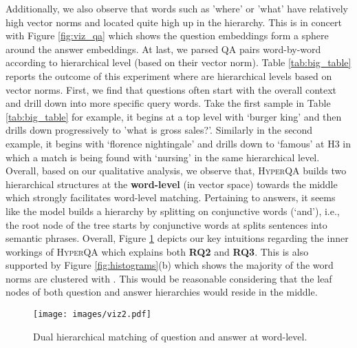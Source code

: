 \documentclass[sigconf]{acmart}
\begin{document}
 Additionally, we also observe that words such as 'where' or 'what' have relatively high vector norms and located quite high up in the hierarchy. This is in concert with Figure \ref{fig:viz_qa} which shows the question embeddings form a sphere around the answer embeddings. At last, we parsed QA pairs word-by-word according to hierarchical level (based on their vector norm). Table \ref{tab:big_table} reports the outcome of this experiment where  are hierarchical levels based on vector norms. First, we find that questions often start with the overall context and drill down into more specific query words. Take the first sample in Table \ref{tab:big_table} for example, it begins at a top level with `burger king' and then drills down progressively to 'what is gross sales?'. Similarly in the second example, it begins with `florence nightingale' and drills down to `famous' at H3 in which a match is being found with `nursing' in the same hierarchical level. Overall, based on our qualitative analysis, we observe that, \textsc{HyperQA} builds two hierarchical structures at the \textbf{word-level} (in vector space) towards the middle which strongly facilitates word-level matching. Pertaining to answers, it seems like the model builds a hierarchy by splitting on conjunctive words (`and'), i.e., the root node of the tree starts by conjunctive words at splits sentences into semantic phrases. Overall, Figure \ref{words_ex} depicts our key intuitions regarding the inner workings of \textsc{HyperQA} which explains both \textbf{RQ2} and \textbf{RQ3}. This is also supported by Figure \ref{fig:histograms}(b) which shows the majority of the word norms are clustered with . This would be reasonable considering that the leaf nodes of both question and answer hierarchies would reside in the middle. 
\begin{figure}[H]
\begin{center}
\texttt{[image: images/viz2.pdf]}
\vspace{-1em}
\caption{Dual hierarchical matching of question and answer at word-level.}
\label{words_ex}
\end{center}
\end{figure}

\vspace{-1em}
\end{document}
